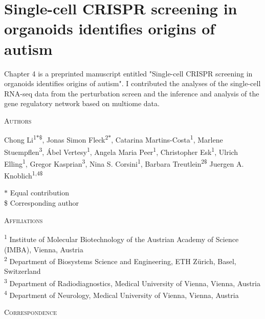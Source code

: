 \thispagestyle{plain}
\section{Single-cell CRISPR screening in organoids identifies origins of autism}

\vspace{0.5cm}

Chapter 4 is a preprinted manuscript entitled "Single-cell CRISPR screening in organoids identifies origins of autism". I contributed the analyses of the single-cell RNA-seq data from the perturbation screen and the inference and analysis of the gene regulatory network based on multiome data.

\vspace{1cm}

\noindent
{\large\textsc{Authors}}

\noindent
Chong Li\textsuperscript{1$*$\$}, 
Jonas Simon Fleck\textsuperscript{2$*$}, 
Catarina Martins-Costa\textsuperscript{1}, 
Marlene Stuempflen\textsuperscript{3}, 
Ábel Vertesy\textsuperscript{1}, 
Angela Maria Peer\textsuperscript{1}, 
Christopher Esk\textsuperscript{1}, 
Ulrich Elling\textsuperscript{1}, 
Gregor Kasprian\textsuperscript{3}, 
Nina S. Corsini\textsuperscript{1}, 
Barbara Treutlein\textsuperscript{2\$}
Juergen A. Knoblich\textsuperscript{1,4\$}

\vspace{0.5cm}

\noindent
$\ast$ Equal contribution\\
\$ Corresponding author

\vspace{1cm}

\noindent
{\large\textsc{Affiliations}}

\noindent
\textsuperscript{1} Institute of Molecular Biotechnology of the Austrian Academy of Science (IMBA), Vienna, Austria\\
\textsuperscript{2} Department of Biosystems Science and Engineering, ETH Zürich, Basel, Switzerland\\
\textsuperscript{3} Department of Radiodiagnostics, Medical University of Vienna, Vienna, Austria\\
\textsuperscript{4} Department of Neurology, Medical University of Vienna, Vienna, Austria

\vspace{1cm}

\noindent
{\large\textsc{Correspondence}} 

